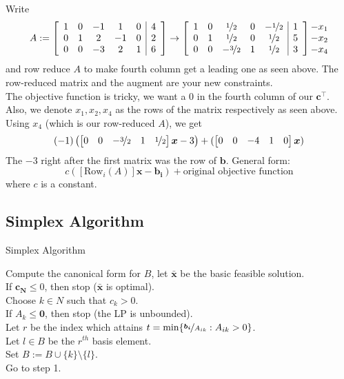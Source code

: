 Write
\[A:=
    \left[\begin{array}{ccccc|c}  
        1 & 0 & -1 & 1 & 0 & 4\\
        0 & 1 & 2 & -1 & 0 & 2\\
        0 & 0 & -3 & 2 & 1 & 6
       \end{array}\right]
    \rightarrow
    \left[\begin{array}{ccccc|c}
        1 & 0 & \nicefrac{1}{2} & 0 & -\nicefrac{1}{2} & 1\\
        0 & 1 & \nicefrac{1}{2} & 0 & \nicefrac{1}{2} & 5\\
        0 & 0 & -\nicefrac{3}{2} & 1 & \nicefrac{1}{2} & 3
    \end{array}\right]
    \begin{matrix}
        -x_1\\
        -x_2\\
        -x_4
    \end{matrix}
\]
and row reduce $A$ to make fourth column get a leading one as seen above.
The row-reduced matrix and the augment are your new constraints.\\
The objective function is tricky, we want a 0 in the fourth column of our $\bm{c}^\top $.
Also, we denote $x_1,x_2,x_4$ as the rows of the matrix respectively as seen above.
Using $x_4$ (which is our row-reduced $A$), we get
\[(-1)\left(
    \begin{bmatrix}
        0 & 0 & -\nicefrac{3}{2} & 1 & \nicefrac{1}{2}
    \end{bmatrix}\bm{x}-3\right)+
    (\begin{bmatrix}
        0 & 0 & -4 & 1 & 0
    \end{bmatrix}\bm{x})
\]
The $-3$ right after the first matrix was the row of $\bm{b}$. General form:
\[ c([\text{Row}_i(A)]\bm{x}-\bm{b_i})+\text{original objective function} \]
where $ c $ is a constant.

\subsection{Simplex Algorithm}
\begin{algorithm}
    \caption{Simplex Algorithm}
    Compute the canonical form for $B$, let $\bm{\bar{x}}$ be the basic feasible solution.\\
    If $\bm{c_N}\le 0$, then stop ($\bm{\bar{x}}$ is optimal).\\
    Choose $k\in N$ such that $c_k>0$.\\
    If $A_k\le \bm{0}$, then stop (the LP is unbounded).\\
    Let $r$ be the index which attains $t=\min\{\nicefrac{\bm{b_i}}{A_{ik}} : A_{ik}>0\}$.\\
    Let $l\in B$ be the $r^{th}$ basis element.\\
    Set $B:=B\cup\{k\}\setminus\{l\}$.\\
    Go to step 1.
\end{algorithm}


